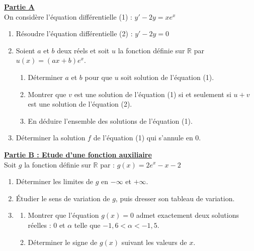 \documentclass[12pt,a4paper]{article}
\begin{document}
\noindent \underline{\textbf{Partie A}} \\
On considère l'équation différentielle (1) : $y' - 2y = xe^x$
\begin{enumerate}
    \item Résoudre l'équation différentielle (2) : $y' - 2y = 0$
    \item Soient $a$ et $b$ deux réels et soit $u$ la fonction définie sur $\mathbb{R}$ par $u(x) = (ax + b)e^x$.
    \begin{enumerate}
        \item Déterminer $a$ et $b$ pour que $u$ soit solution de l'équation (1).
        \item Montrer que $v$ est une solution de l'équation (1) si et seulement si $u+v$ est une solution de l'équation (2).
        \item En déduire l'ensemble des solutions de l'équation (1).
    \end{enumerate}
    \item Déterminer la solution $f$ de l'équation (1) qui s'annule en 0.
\end{enumerate}

\vspace{0.8cm}

\noindent \underline{\textbf{Partie B : Etude d'une fonction auxiliaire}} \\
Soit $g$ la fonction définie sur $\mathbb{R}$ par : $g(x) = 2e^x - x - 2$
\begin{enumerate}
    \item Déterminer les limites de $g$ en $-\infty$ et $+\infty$.
    \item Étudier le sens de variation de $g$, puis dresser son tableau de variation.
    \item \begin{enumerate}
        \item Montrer que l'équation $g(x)=0$ admet exactement deux solutions réelles : 0 et $\alpha$ telle que $-1,6 < \alpha < -1,5$.
        \item Déterminer le signe de $g(x)$ suivant les valeurs de $x$.
    \end{enumerate}
\end{enumerate}

\vspace{0.3cm}
\end{document}
